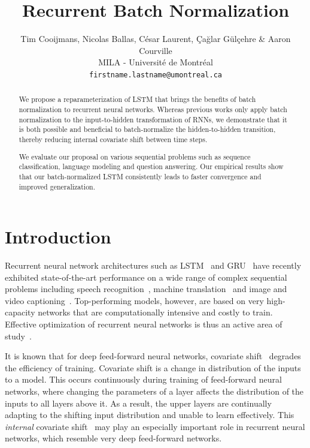 \documentclass{article} %
\title{Recurrent Batch Normalization}
\author{
Tim Cooijmans, Nicolas Ballas, C\'esar Laurent, Çağlar Gülçehre \& Aaron Courville \\
MILA - Universit\'e de Montr\'eal \\
\texttt{firstname.lastname@umontreal.ca} \\
}
\begin{document}
\maketitle

\begin{abstract}
We propose a reparameterization of LSTM that brings the benefits of batch normalization to recurrent neural networks.
Whereas previous works only apply batch normalization to the input-to-hidden transformation of RNNs,
we demonstrate that it is both possible and beneficial to batch-normalize the hidden-to-hidden transition,
thereby reducing internal covariate shift between time steps.

We evaluate our proposal on various sequential problems such as sequence classification, language modeling and question answering.
Our empirical results show that our batch-normalized LSTM consistently leads to faster convergence and improved generalization.
\end{abstract}

\section{Introduction}

Recurrent neural network architectures such as LSTM~\citep{lstm} and GRU~\citep{cho2014learning} have recently exhibited
state-of-the-art performance on a wide range of complex sequential problems including speech recognition~\cite{baidu},
machine translation~\citep{bahdanau2014neural} and image and video captioning~\citep{xu2015show,yao2015describing}.
Top-performing models, however, are based on very high-capacity networks that are computationally intensive and costly to train.
Effective optimization of recurrent neural networks is thus an active area of study~\citep{pascanudifficulty,hessianfree,ollivier}.

It is known that for deep feed-forward neural networks, covariate shift~\citep{shimodaira2000improving,batchnorm}
degrades the efficiency of training.
Covariate shift is a change in distribution of the inputs to a model.
This occurs continuously during training of feed-forward neural networks,
where changing the parameters of a layer affects the distribution of the inputs to all layers above it.
As a result, the upper layers are continually adapting to the shifting input distribution and unable to learn effectively.
This \emph{internal} covariate shift~\citep{batchnorm} may play an especially important role in recurrent neural networks,
which resemble very deep feed-forward networks.
\end{document}

